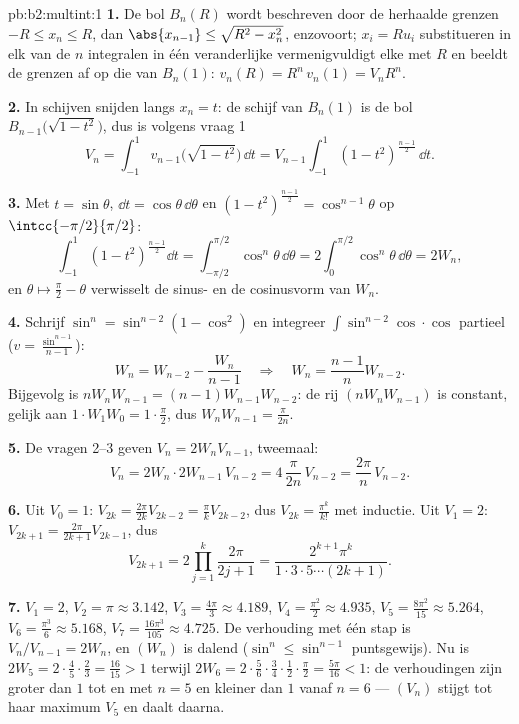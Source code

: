 \begin{solution}{pb:b2:multint:1}
\textbf{1.} De bol $B_n(R)$ wordt beschreven door de herhaalde
grenzen $-R \leq x_n \leq R$, dan $\abs{x_{n-1}} \leq \sqrt{R^2 -
x_n^2}$, enzovoort; $x_i = Ru_i$ substitueren in elk van de $n$
integralen in één veranderlijke vermenigvuldigt elke met $R$ en
beeldt de grenzen af op die van $B_n(1)$: $v_n(R) = R^n\,v_n(1) =
V_nR^n$.

\textbf{2.} In schijven snijden langs $x_n = t$: de schijf van
$B_n(1)$ is de bol $B_{n-1}\bigl(\sqrt{1 - t^2}\bigr)$, dus is
volgens vraag 1
\[
V_n = \int_{-1}^1 v_{n-1}\bigl(\sqrt{1 - t^2}\bigr)\,\dd t
= V_{n-1}\int_{-1}^{1}(1 - t^2)^{\frac{n-1}2}\,\dd t .
\]

\textbf{3.} Met $t = \sin\theta$, $\dd t = \cos\theta\,\dd\theta$
en $(1 - t^2)^{\frac{n-1}2} = \cos^{n-1}\theta$ op
$\intcc{-\pi/2}{\pi/2}$:
\[
\int_{-1}^1(1 - t^2)^{\frac{n-1}2}\dd t
= \int_{-\pi/2}^{\pi/2}\cos^n\theta\,\dd\theta
= 2\int_0^{\pi/2}\cos^n\theta\,\dd\theta = 2W_n,
\]
en $\theta \mapsto \frac\pi2 - \theta$ verwisselt de sinus- en de
cosinusvorm van $W_n$.

\textbf{4.} Schrijf $\sin^n = \sin^{n-2}(1 - \cos^2)$ en integreer
$\int\sin^{n-2}\cos\cdot\cos$ partieel ($v =
\frac{\sin^{n-1}}{n-1}$):
\[
W_n = W_{n-2} - \frac{W_n}{n-1}
\quad\Longrightarrow\quad
W_n = \frac{n-1}{n}W_{n-2}.
\]
Bijgevolg is $nW_nW_{n-1} = (n-1)W_{n-1}W_{n-2}$: de rij
$(nW_nW_{n-1})$ is constant, gelijk aan $1\cdot W_1W_0 =
1\cdot\frac\pi2$, dus $W_nW_{n-1} = \frac{\pi}{2n}$.

\textbf{5.} De vragen 2--3 geven $V_n = 2W_nV_{n-1}$, tweemaal:
\[
V_n = 2W_n\cdot 2W_{n-1}\,V_{n-2}
= 4\,\frac{\pi}{2n}\,V_{n-2} = \frac{2\pi}n\,V_{n-2}.
\]

\textbf{6.} Uit $V_0 = 1$: $V_{2k} = \frac{2\pi}{2k}V_{2k-2} =
\frac\pi kV_{2k-2}$, dus $V_{2k} = \frac{\pi^k}{k!}$ met inductie.
Uit $V_1 = 2$: $V_{2k+1} = \frac{2\pi}{2k+1}V_{2k-1}$, dus
\[
V_{2k+1} = 2\prod_{j=1}^k\frac{2\pi}{2j+1}
= \frac{2^{k+1}\pi^k}{1\cdot3\cdot5\cdots(2k+1)} .
\]

\textbf{7.} $V_1 = 2$, $V_2 = \pi \approx 3.142$, $V_3 =
\frac{4\pi}3 \approx 4.189$, $V_4 = \frac{\pi^2}2 \approx 4.935$,
$V_5 = \frac{8\pi^2}{15} \approx 5.264$, $V_6 = \frac{\pi^3}6
\approx 5.168$, $V_7 = \frac{16\pi^3}{105} \approx 4.725$. De
verhouding met één stap is $V_n/V_{n-1} = 2W_n$, en $(W_n)$ is
dalend ($\sin^n \leq \sin^{n-1}$ puntsgewijs). Nu is $2W_5 =
2\cdot\frac45\cdot\frac23 = \frac{16}{15} > 1$ terwijl $2W_6 =
2\cdot\frac56\cdot\frac34\cdot\frac12\cdot\frac\pi2 =
\frac{5\pi}{16} < 1$: de verhoudingen zijn groter dan $1$ tot en
met $n = 5$ en kleiner dan $1$ vanaf $n = 6$ --- $(V_n)$ stijgt tot
haar maximum $V_5$ en daalt daarna.


\end{solution}
